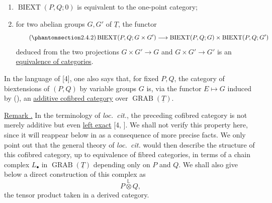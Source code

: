 \begin{enumerate}[label=\alph*)]
\item $\operatorname{BIEXT}(P,Q;0)$ is equivalent to the one-point
category;
\item for two abelian groups $G,G'$ of $\underline T$, the functor
\begin{equation}\tag{\SGARefTarget{sga7.sga7i.evii.n2-4-2}{2.4.2}}
 \operatorname{BIEXT}(P,Q;G\times G')
 \longrightarrow
 \operatorname{BIEXT}(P,Q;G)\times
 \operatorname{BIEXT}(P,Q;G')
\end{equation}
deduced from the two projections $G\times G'\longrightarrow G$ and
$G\times G'\longrightarrow G'$ is an
\underline{equivalence of categories}.
\end{enumerate}
In the language of [4], one also says that, for fixed $P,Q$, the
category of biextensions of $(P,Q)$ by variable groups $G$ is, via the
functor $E\mapsto G$ induced by (), an
\underline{additive cofibred category} over
$\operatorname{GRAB}(\underline T)$.

\underline{Remark .} In the terminology of \emph{loc.\ cit.}, the
preceding cofibred category is not merely additive but even
\underline{left exact} [4, ]. We shall not verify this property here,
since it will reappear below in  as a consequence of more precise
facts. We only point out that the general theory of \emph{loc.\ cit.}
would then describe the structure of this cofibred category, up to
equivalence of fibred categories, in terms of a chain complex
$L_\bullet$ in $\operatorname{GRAB}(\underline T)$ depending only on
$P$ and $Q$. We shall also give below a direct construction of this
complex as
\[
 P\overset{\mathbb L}{\otimes}Q,
\]
the tensor product taken in a derived category.

